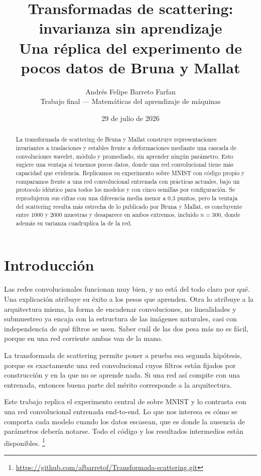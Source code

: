 \documentclass[twocolumn,10pt,a4paper]{article}
\title{\vspace{-1.2em}\textbf{Transformadas de scattering: invarianza sin
aprendizaje}\\[0.2em]
\large Una réplica del experimento de pocos datos de Bruna y Mallat}
\author{Andrés Felipe Barreto Farfan\\[0.2em]
\small Trabajo final — Matemáticas del aprendizaje de máquinas}
\date{\small{29 de julio de 2026}}
\begin{document}
\maketitle

\begin{abstract}
\noindent
La transformada de scattering de Bruna y Mallat construye representaciones
invariantes a traslaciones y estables frente a deformaciones mediante una
cascada de convoluciones wavelet, módulo y promediado, sin aprender
ningún parámetro. Esto sugiere una ventaja si tenemos pocos datos, donde
una red convolucional tiene más capacidad que evidencia. Replicamos su
experimento sobre MNIST con código propio y comparamos frente a una red
convolucional entrenada con prácticas actuales, bajo un protocolo idéntico para
todos los modelos y con cinco semillas por configuración. Se reprodujeron sus
cifras con una diferencia media menor a 0,3 puntos, pero la ventaja del scattering resulta más estrecha de lo publicado por Bruna y Mallat, es concluyente entre $1000$ y $2000$ muestras y
desaparece en ambos extremos, incluido $n=300$, donde además su varianza
cuadruplica la de la red.
\end{abstract}

\section{Introducción}

Las redes convolucionales funcionan muy bien, y no está del todo claro por qué.
Una explicación atribuye su éxito a los pesos que aprenden. Otra lo atribuye a la
arquitectura misma, la forma de encadenar convoluciones, no linealidades y
submuestreo ya encaja con la estructura de las imágenes naturales, casi con
independencia de qué filtros se usen. Saber cuál de las dos pesa más no es fácil,
porque en una red corriente ambas van de la mano.

La transformada de scattering \cite{bruna2011,bruna2013} permite poner a prueba
      esa segunda hipótesis, porque es exactamente una red convolucional cuyos filtros
están fijados por construcción y en la que no se aprende nada. Si una red
así compite con una entrenada, entonces buena parte del mérito corresponde a la
arquitectura.

Este trabajo replica el experimento central de \cite{bruna2013} sobre MNIST y lo
contrasta con una red convolucional entrenada end-to-end. Lo que nos interesa es cómo se comporta cada modelo
cuando los datos escasean, que es donde la ausencia de parámetros debería
notarse. Todo el código y los resultados intermedios están disponibles.%
\footnote{\url{https://github.com/afbarretof/Transformada-scattering.git}}
\end{document}
